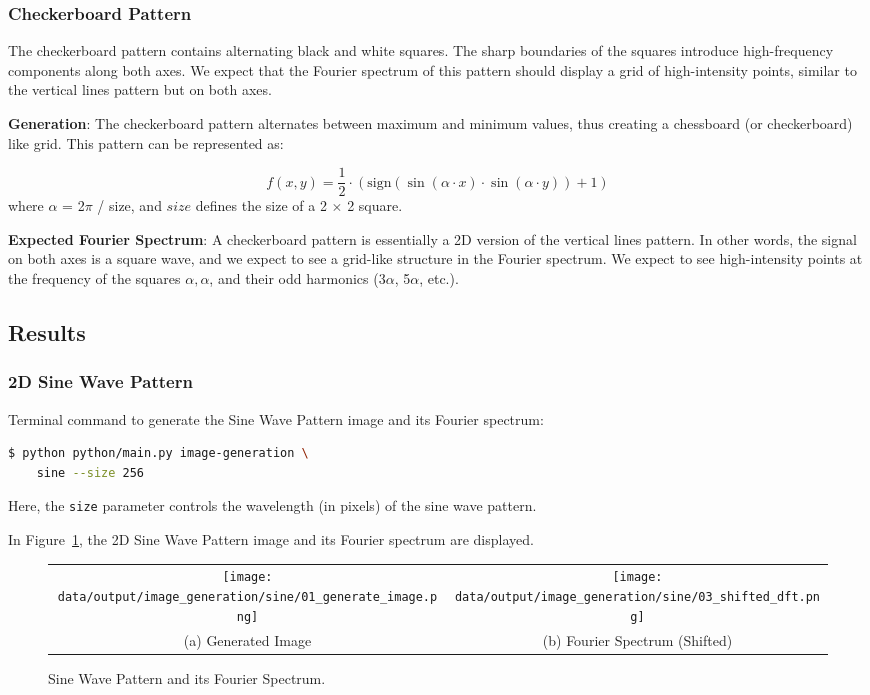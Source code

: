 \documentclass[a4paper,12pt]{article}
\begin{document}
\subsubsection{Checkerboard Pattern}
The checkerboard pattern contains alternating black and white squares. The sharp boundaries of the squares introduce high-frequency components along both axes. We expect that the Fourier spectrum of this pattern should display a grid of high-intensity points, similar to the vertical lines pattern but on both axes.

\textbf{Generation}: The checkerboard pattern alternates between maximum and minimum values, thus creating a chessboard (or checkerboard) like grid. This pattern can be represented as:

\[
    f(x, y) = \frac{1}{2} \cdot \left( \text{sign}(\sin(\alpha \cdot x) \cdot \sin(\alpha \cdot y)) + 1 \right)
\]
where \( \alpha \) = 2\(\pi\) / size, and \( size \) defines the size of a 2 \(\times\) 2 square.

\textbf{Expected Fourier Spectrum}: A checkerboard pattern is essentially a 2D version of the vertical lines pattern. In other words, the signal on both axes is a square wave, and we expect to see a grid-like structure in the Fourier spectrum. We expect to see high-intensity points at the frequency of the squares \( \alpha, \alpha \), and their odd harmonics (3\(\alpha\), 5\(\alpha\), etc.).

\subsection{Results}

\subsubsection{2D Sine Wave Pattern}

Terminal command to generate the Sine Wave Pattern image and its Fourier spectrum:

\begin{lstlisting}[language=bash]
$ python python/main.py image-generation \
    sine --size 256
\end{lstlisting}

Here, the \texttt{size} parameter controls the wavelength (in pixels) of the sine wave pattern.

In Figure~\ref{fig:sine-wave-pattern}, the 2D Sine Wave Pattern image and its Fourier spectrum are displayed.

\begin{figure}
    \begin{tabular}{cc}
        \texttt{[image: data/output/image\_generation/sine/01\_generate\_image.png]} &
        \texttt{[image: data/output/image\_generation/sine/03\_shifted\_dft.png]} \\
        (a) Generated Image & (b) Fourier Spectrum (Shifted) \\
    \end{tabular}
    \caption{\label{fig:sine-wave-pattern} Sine Wave Pattern and its Fourier Spectrum.}
\end{figure}
\end{document}
